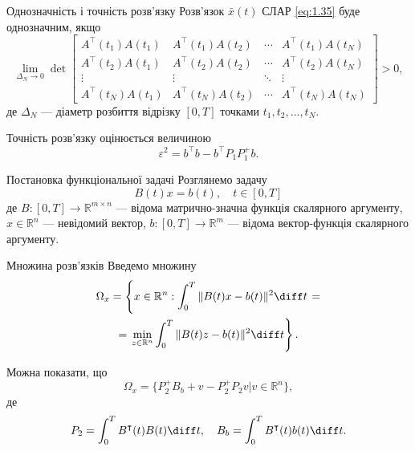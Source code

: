 \begin{mframe}{Однозначність і точність розв'язку}
    Розв'язок $\bar x(t)$ СЛАР \eqref{eq:1.35} буде однозначним, якщо
    \begin{equation}
        \label{eq:1.47}
        \lim_{\Delta_N \to 0} \det \begin{bmatrix}
            A^\intercal(t_1) A(t_1) & A^\intercal(t_1) A(t_2) & \cdots & 
                A^\intercal(t_1) A(t_N) \\
            A^\intercal(t_2) A(t_1) & A^\intercal(t_2) A(t_2) & \cdots & 
                A^\intercal(t_2) A(t_N) \\
            \vdots & \vdots & \ddots & \vdots \\
            A^\intercal(t_N) A(t_1) & A^\intercal(t_N) A(t_2) & \cdots & 
                A^\intercal(t_N) A(t_N)
        \end{bmatrix} > 0,
    \end{equation}
    де $\Delta_N$ --- діаметр розбиття відрізку $[0, T]$ точками
    $t_1, t_2, \ldots, t_N$. \medskip

    Точність розв'язку оцінюється величиною
    \begin{equation}
        \label{eq:1.49}
        \varepsilon^2 = b^\intercal b - b^\intercal P_1 P_1^+ b.
    \end{equation}
\end{mframe}

\begin{mframe}{Постановка функціональної задачі}
    Розглянемо задачу
    \begin{equation}
        \label{eq:1.36}
        B(t) x = b(t), \quad t \in [0, T]
    \end{equation}
    де $B: [0, T] \to \mathbb{R}^{m \times n}$ --- відома матрично-значна
    функція скалярного аргументу, $x \in \mathbb{R}^n$ --- невідомий вектор,
    $b: [0, T] \to \mathbb{R}^m$ --- відома вектор-функція скалярного аргументу.
\end{mframe}

\begin{mframe}{Множина розв'язків}
    Введемо множину
    \begin{multline}
        \label{eq:1.40}
        \Omega_x = \left\{ x \in \mathbb{R}^n: 
        \int_0^T \|B(t) x - b(t)\|^2 \diff t \right. = \\ 
        = \left. \min_{z \in \mathbb{R}^n} 
        \int_0^T \|B(t) z - b(t)\|^2 \diff t  \right\}.
    \end{multline}
    
    Можна показати, що
    \begin{equation}
        \label{eq:1.44}
        \Omega_x = \Big\{ P_2^+ B_b + v - P_2^+ P_2 v \Big| 
        v \in \mathbb{R}^n \Big\},
    \end{equation}
    де
    \begin{equation*}
        P_2 = \int_0^T B^\intercal(t) B(t) \diff t, \quad B_b = 
        \int_0^T B^\intercal(t) b(t) \diff t.
    \end{equation*}
\end{mframe}

